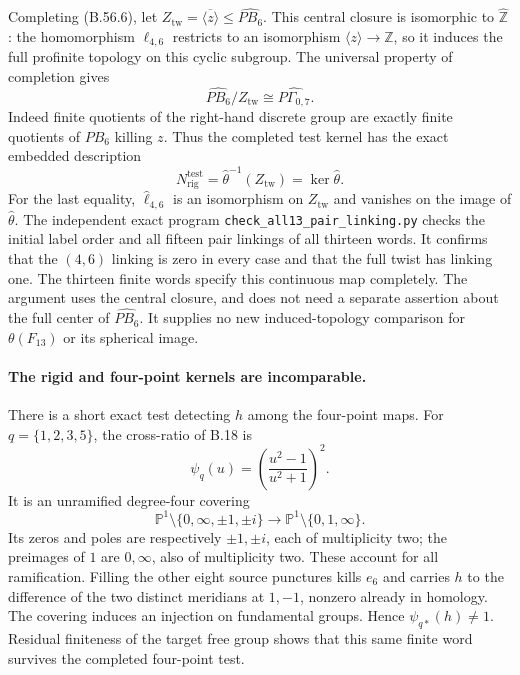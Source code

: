 Completing (B.56.6), let
$Z_{\mathrm{tw}}=\overline{\langle z\rangle}\leq\widehat{PB_6}$.
This central closure is isomorphic to $\widehat{\mathbb Z}$:
the homomorphism $\ell_{4,6}$ restricts to an isomorphism
$\langle z\rangle\to\mathbb Z$, so it induces the full
profinite topology on this cyclic subgroup.  The universal property of completion
gives
\[
 \widehat{PB_6}/Z_{\mathrm{tw}}\cong\widehat{P\Gamma_{0,7}}.
\]
Indeed finite quotients of the right-hand discrete group are
exactly finite quotients of $PB_6$ killing $z$.
Thus the completed test kernel has the exact embedded description
\[
       N_{\mathrm{rig}}^{\mathrm{test}}
                    =\widehat\theta^{-1}(Z_{\mathrm{tw}})=\ker\widehat\theta.
 \tag{B.56.8}
\]
For the last equality, $\widehat\ell_{4,6}$ is an isomorphism
on $Z_{\mathrm{tw}}$ and vanishes on the image of
$\widehat\theta$.  The independent exact program
\texttt{check\_all13\_pair\_linking.py} checks the initial
label order and all fifteen pair linkings of all thirteen words.
It confirms that the $(4,6)$ linking is zero in every case and
that the full twist has linking one.
The thirteen finite words specify this continuous map completely.
The argument uses the central closure, and does not need a
separate assertion about the full center of $\widehat{PB_6}$.
It supplies no new induced-topology comparison for
$\theta(F_{13})$ or its spherical image.

\paragraph{The rigid and four-point kernels are incomparable.}
There is a short exact test detecting $h$ among the four-point
maps.  For $q=\{1,2,3,5\}$, the cross-ratio of B.18 is
\[
                   \psi_q(u)=\left(\frac{u^2-1}{u^2+1}\right)^2.
 \tag{B.56.9}
\]
It is an unramified degree-four covering
\[
 \mathbb P^1\setminus\{0,\infty,\pm1,\pm i\}
                   \longrightarrow\mathbb P^1\setminus\{0,1,\infty\}.
\]
Its zeros and poles are respectively $\pm1,\pm i$, each of
multiplicity two; the preimages of $1$ are $0,\infty$, also
of multiplicity two.  These account for all ramification.
Filling the other eight source punctures kills $e_6$ and
carries $h$ to the difference of the two distinct meridians
at $1,-1$, nonzero already in homology.  The covering induces
an injection on fundamental groups.  Hence
$\psi_{q*}(h)\ne1$.  Residual finiteness of the target
free group shows that this same finite word survives the
completed four-point test.

